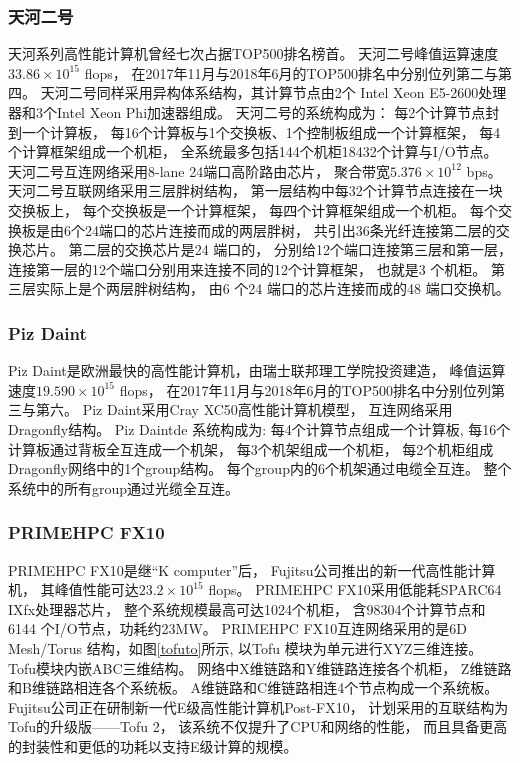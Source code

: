 \subsubsection{天河二号}
天河系列高性能计算机曾经七次占据TOP500排名榜首。
天河二号峰值运算速度$33.86\times10^{15}$ flops，
在2017年11月与2018年6月的TOP500排名中分别位列第二与第四。
天河二号同样采用异构体系结构，其计算节点由2个
Intel Xeon E5-2600处理器和3个Intel Xeon Phi加速器组成。
天河二号的系统构成为：
每2个计算节点封到一个计算板，
每16个计算板与1个交换板、1个控制板组成一个计算框架，
每4个计算框架组成一个机柜，
全系统最多包括144个机柜18432个计算与I/O节点。
天河二号互连网络采用8-lane 24端口高阶路由芯片，
聚合带宽$5.376\times10^{12}$ bps。
天河二号互联网络采用三层胖树结构，
第一层结构中每32个计算节点连接在一块交换板上，
每个交换板是一个计算框架，
每四个计算框架组成一个机柜。
每个交换板是由6个24端口的芯片连接而成的两层胖树，
共引出36条光纤连接第二层的交换芯片。
第二层的交换芯片是24 端口的，
分别给12个端口连接第三层和第一层，
连接第一层的12个端口分别用来连接不同的12个计算框架，
也就是3 个机柜。
第三层实际上是个两层胖树结构，
由6 个24 端口的芯片连接而成的48 端口交换机。

\subsubsection{Piz Daint}
Piz Daint是欧洲最快的高性能计算机，由瑞士联邦理工学院投资建造，
峰值运算速度$19.590\times10^{15}$ flops，
在2017年11月与2018年6月的TOP500排名中分别位列第三与第六。
Piz Daint采用Cray XC50高性能计算机模型，
互连网络采用Dragonfly结构。
Piz Daintde 系统构成为:
每4个计算节点组成一个计算板,
每16个计算板通过背板全互连成一个机架，
每3个机架组成一个机柜，
每2个机柜组成Dragonfly网络中的1个group结构。
每个group内的6个机架通过电缆全互连。
整个系统中的所有group通过光缆全互连。

\subsubsection{PRIMEHPC FX10}
PRIMEHPC FX10是继“K computer”后，
Fujitsu公司推出的新一代高性能计算机，
其峰值性能可达$23.2\times10^{15}$ flops。
PRIMEHPC FX10采用低能耗SPARC64 IXfx处理器芯片，
整个系统规模最高可达1024个机柜，
含98304个计算节点和6144 个I/O节点，功耗约23MW。
PRIMEHPC FX10互连网络采用的是6D Mesh/Torus 结构，如图\ref{tofuto}所示,
以Tofu 模块为单元进行XYZ三维连接。
Tofu模块内嵌ABC三维结构。
网络中X维链路和Y维链路连接各个机柜，
Z维链路和B维链路相连各个系统板。
A维链路和C维链路相连4个节点构成一个系统板。
Fujitsu公司正在研制新一代E级高性能计算机Post-FX10，
计划采用的互联结构为Tofu的升级版——Tofu 2，
该系统不仅提升了CPU和网络的性能，
而且具备更高的封装性和更低的功耗以支持E级计算的规模。

